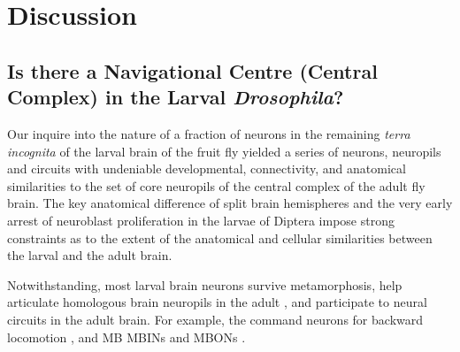 \chapter{Discussion}




\section{Is there a Navigational Centre (Central Complex) in the Larval \textit{Drosophila}?}
Our inquire into the nature of a fraction of neurons in the remaining \textit{terra incognita} of the larval brain of the fruit fly yielded a series of neurons, neuropils and circuits with undeniable developmental, connectivity, and anatomical similarities to the set of core neuropils of the central complex of the adult fly brain.
The key anatomical difference of split brain hemispheres and the very early arrest of neuroblast proliferation in the larvae of Diptera impose strong constraints as to the extent of the anatomical and cellular similarities between the larval and the adult brain.

Notwithstanding, most larval brain neurons survive metamorphosis, help articulate homologous brain neuropils in the adult \citep{prieto2012embryonic}, and participate to neural circuits in the adult brain. For example, the command neurons for backward locomotion \citep{carreira2018mdn}, and MB MBINs and MBONs \citep{truman2023metamorphosis}.

